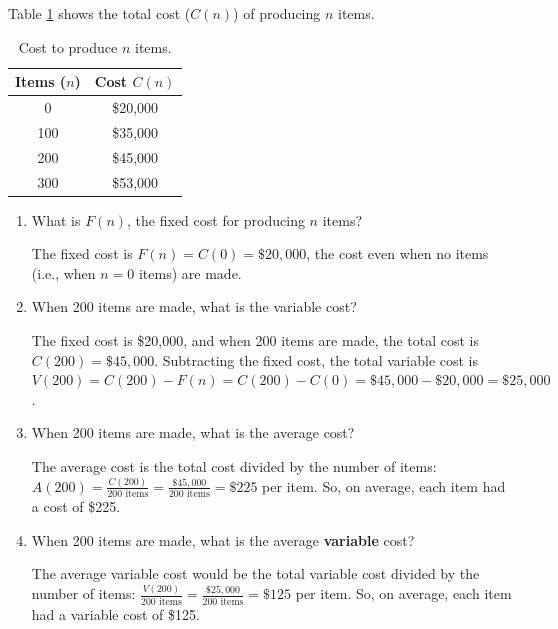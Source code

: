 \begin{example}
Table \ref{tab:1-2-cost} shows the total cost ($C(n)$) of producing $n$ items.
\begin{table}[ht!]
\centering
\begin{tabular}{cc}
\toprule
Items ($n$)	& Cost $C(n)$ \\
\midrule
0	& \$20,000\\
100	& \$35,000\\
200	& \$45,000\\	
300	& \$53,000\\
\bottomrule
\end{tabular}
\caption{Cost to produce $n$ items.}
\label{tab:1-2-cost}
\end{table}
\begin{enumerate}[label=(\alph*)]
    \item What is $F(n)$, the fixed cost for producing $n$ items?

    \begin{solution}
    The fixed cost is $F(n) = C(0) = \$20,000$, the cost even when no items (i.e., when $n=0$ items) are made.
    \end{solution}
    \item When 200 items are made, what is the variable cost?

    \begin{solution}
    The fixed cost is \$20,000, and when 200 items are made, the total cost is $C(200) = \$45,000$. Subtracting the fixed cost, the total variable cost is $V(200) = C(200) - F(n) = C(200) - C(0) = \$45,000 - \$20,000 = \$25,000$.
    \end{solution}
    \item When 200 items are made, what is the average cost?

    \begin{solution}
    The average cost is the total cost divided by the number of items: $A(200) = \frac{C(200)}{200 \mbox{ items}} = \frac{\$45,000}{200\mbox{ items}} = \$225$ per item. So, on average, each item had a cost of \$225.
    \end{solution}    
    
    \item When 200 items are made, what is the average {\bf variable} cost?

    \begin{solution}
    The average variable cost would be the total variable cost divided by the number of items: $\frac{V(200)}{200 \mbox{ items}} = \frac{\$25,000}{200\mbox{ items}} = \$125$ per item. So, on average, each item had a variable cost of \$125.
    \end{solution}
\end{enumerate}

\end{example}

